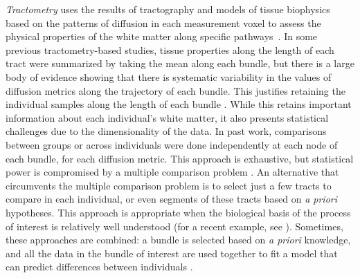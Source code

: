 \documentclass[10pt,letterpaper]{article}
\begin{document}
\emph{Tractometry} uses the results of tractography and models
of tissue biophysics based on the patterns of diffusion in each measurement
voxel to assess the physical properties of the white matter along specific
pathways~\cite{Jones2005-yq, Bells2011-cf}.
In some previous tractometry-based studies, tissue properties along the
length of each tract were summarized by taking the mean along each
bundle, but there is a large body of evidence showing that there is
systematic variability in the values of diffusion metrics along the
trajectory of each bundle. This justifies retaining the individual
samples along the length of each bundle
.
While this retains important information about each individual's white
matter, it also presents statistical challenges due to the dimensionality of
the data. In past work, comparisons between groups or across individuals were
done independently at each node of each bundle, for each
diffusion metric. This approach is exhaustive, but
statistical power is compromised by a multiple comparison problem
.
An alternative that
circumvents the multiple comparison problem is to select just a few
tracts to compare in each individual, or even
segments of these tracts based on \emph{a priori} hypotheses. This
approach is appropriate when the biological basis of the process
of interest is relatively well understood (for a recent example, see
\cite{huber2018rapid}). Sometimes, these approaches are combined: a
bundle is selected based on \emph{a priori} knowledge, and all the data
in the bundle of interest are used together to fit a model that can
predict differences between individuals \cite{dayan2016profilometry}.
\end{document}
